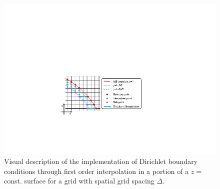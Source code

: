 \documentclass[a4paper,11pt]{article}
\numberwithin{equation}{section}
\begin{document}
\begin{figure}[t!]
        \centering
        \includegraphics[width=6.0in,clip=true]{plots/lego_circle/Dirichlet_conditions.pdf}
\parbox{5.0in}{\caption{Visual description of the implementation of Dirichlet boundary conditions through first order interpolation in a portion of a $z=$const. surface for a grid with spatial grid spacing $\Delta$.
        }\label{fig:lego_circle_dirbc}}
\end{figure}

\end{document}
